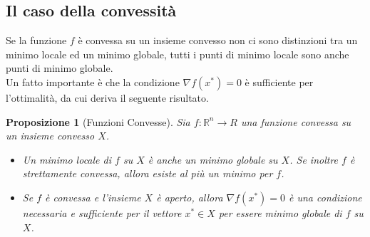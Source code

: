 \documentclass[a4paper, 12pt]{article}
\newtheorem{prop}{Proposizione}
\begin{document}
\subsection{Il caso della convessità}
Se la funzione $f$ è convessa su un insieme convesso non ci sono distinzioni tra un minimo locale ed un minimo globale, tutti i punti di minimo locale sono anche punti di minimo globale.\\
Un fatto importante è che la condizione $\nabla f(x^\ast) = 0$ è sufficiente per l'ottimalità, da cui deriva il seguente risultato.
\begin{prop}[Funzioni Convesse] Sia $f:\mathbb{R}^n \to R$ una funzione convessa su un insieme convesso $X$.
\begin{itemize}
  \item Un minimo locale di $f$ su $X$ è anche un minimo globale su $X$. Se inoltre $f$ è strettamente convessa, allora esiste al più un minimo per $f$.
  \item Se $f$ è convessa e l'insieme $X$ è aperto, allora $\nabla f(x^\ast) = 0$ è una condizione necessaria e sufficiente per il vettore $x^\ast \in X$ per essere minimo globale di $f$ su $X$.
\end{itemize}
\end{prop}
\end{document}

